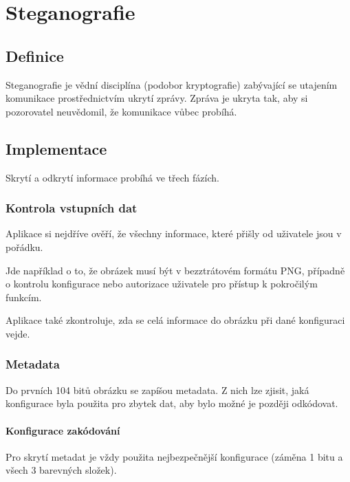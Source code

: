 
\section{Steganografie}\label{sec:steganografie}

\subsection{Definice}\label{subsec:definice}
Steganografie je vědní disciplína (podobor kryptografie) zabývající se utajením
komunikace prostřednictvím ukrytí zprávy.
Zpráva je ukryta tak, aby si pozorovatel neuvědomil,
že komunikace vůbec probíhá.\cite{wiki:steganografie}

\subsection{Implementace}\label{subsec:implementace}
Skrytí a odkrytí informace probíhá ve třech fázích.

\subsubsection{Kontrola vstupních dat}\label{subsubsec:kontrola-vstupnich-dat}
Aplikace si nejdříve ověří, že všechny informace, které přišly od uživatele jsou
v pořádku.

Jde například o to, že obrázek musí být v bezztrátovém formátu PNG, případně
o kontrolu konfigurace nebo autorizace uživatele pro přístup k pokročilým
funkcím.

Aplikace také zkontroluje, zda se celá informace do obrázku při dané konfiguraci
vejde.

\subsubsection{Metadata}\label{subsubsec:metadata}

Do prvních \num{104} bitů obrázku se zapíšou metadata.
Z nich lze zjisit, jaká konfigurace byla použita pro zbytek dat, aby
bylo možné je později odkódovat.

\paragraph{Konfigurace zakódování}

Pro skrytí metadat je vždy použita nejbezpečnější konfigurace
(záměna 1 bitu a všech 3 barevných složek).

